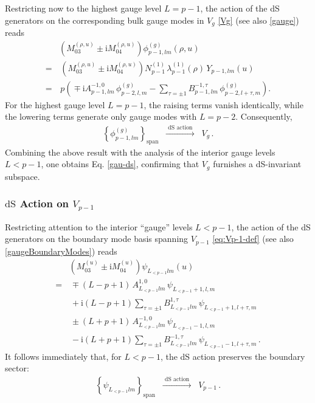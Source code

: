 \documentclass[aps,twocolumn,nofootinbib]{revtex4}
\begin{document}
{\begin{appendix}
Restricting now to the highest gauge level $L=p-1$, the action of the dS generators on the corresponding bulk gauge modes in $V_g$ \eqref{Vg} (see also \eqref{gauge}) reads
\begin{align}
    &\!\!\!\!\!\!\!\left(M_{03}^{(\rho, u)} \pm \mathrm{i}M_{04}^{(\rho, u)}\right) \phi^{(g)}_{p-1,lm}(\rho,u) \nonumber\\[3pt]
    =&\, \left(M_{03}^{(\rho, u)} \pm \mathrm{i} M_{04}^{(\rho, u)}\right) N^{(1)}_{p-1}\, \lambda_{p-1}^{(1)}(\rho)\, Y^{}_{p-1,lm}(u) \nonumber\\[3pt]
    =&\, p \left(\!\mp \mathrm{i} A^{-1,0}_{p-1,lm}\, \phi^{(g)}_{p-2,l,m} - \!\!\sum_{\tau=\pm1}\!\! B^{-1,\tau}_{p-1,lm}\, \phi^{(g)}_{p-2,l+\tau,m} \right) .
\end{align}
For the highest gauge level $L=p-1$, the raising terms vanish identically, while the lowering terms generate only gauge modes with $L=p-2$. Consequently,
\begin{align}
    \left\{\phi^{(g)}_{p-1,lm}\right\}_{\mathrm{span}} \;\;\xrightarrow[]{\text{ dS action }}\;\; V_g \,.
\end{align}
Combining the above result with the analysis of the interior gauge levels $L<p-1$, one obtains Eq. \eqref{gau-ds}, confirming that $V_g$ furnishes a dS-invariant subspace.

 
\subsubsection{$\mathrm{dS}$ Action on $V_{p-1}$}

Restricting attention to the interior ``gauge'' levels $L<p-1$, the action of the dS generators on the boundary mode basis spanning $V_{p-1}$ \eqref{eq:Vp-1-def} (see also \eqref{gaugeBoundaryModes}) reads
\begin{align}
    &\!\!\!\!\!\!\!\left(M_{03}^{(u)} \pm \mathrm{i}M_{04}^{(u)}\right)\psi^{}_{L^{}_{<p-1}lm}(u)
    \nonumber\\[3pt]
    =&\, \mp(L-p+1)\,A^{1,0}_{L^{}_{<p-1}lm}\,
    \psi^{}_{L^{}_{<p-1}+1,l,m}
    \nonumber\\[3pt]
    &\, +\mathrm{i}(L-p+1)\sum_{\tau=\pm1}
    B^{1,\tau}_{L^{}_{<p-1}lm}\,
    \psi^{}_{L^{}_{<p-1}+1,l+\tau,m}
    \nonumber\\[3pt]
    &\, \pm(L+p+1)\,A^{-1,0}_{L^{}_{<p-1}lm}\,
    \psi^{}_{L^{}_{<p-1}-1,l,m}
    \nonumber\\[3pt]
    &\, -\mathrm{i}(L+p+1)\sum_{\tau=\pm1}
    B^{-1,\tau}_{L^{}_{<p-1}lm}\,
    \psi^{}_{L^{}_{<p-1}-1,l+\tau,m} \,.
\end{align}
It follows immediately that, for $L<p-1$, the dS action preserves the boundary sector:
\begin{align}
    \left\{\psi^{}_{L^{}_{<p-1}lm}\right\}_{\mathrm{span}} \;\;\xrightarrow[]{\text{ dS action }}\;\; V_{p-1} \,.
\end{align}


\end{appendix}}
\end{document}
